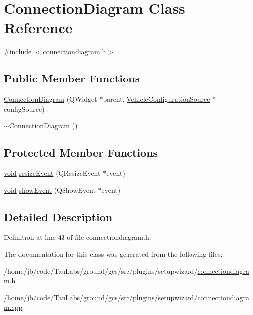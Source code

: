 \hypertarget{class_connection_diagram}{\section{\-Connection\-Diagram \-Class \-Reference}
\label{class_connection_diagram}
}


{\ttfamily \#include $<$connectiondiagram.\-h$>$}

\subsection*{\-Public \-Member \-Functions}
\begin{DoxyCompactItemize}
\item 
\hyperlink{group___connection_diagram_gac4980bbc0b4895238c2f6184739b88b9}{\-Connection\-Diagram} (\-Q\-Widget $\ast$parent, \hyperlink{class_vehicle_configuration_source}{\-Vehicle\-Configuration\-Source} $\ast$config\-Source)
\item 
\hyperlink{group___connection_diagram_gab640bd026ce6a3692e7f4cd1d7d0f907}{$\sim$\-Connection\-Diagram} ()
\end{DoxyCompactItemize}
\subsection*{\-Protected \-Member \-Functions}
\begin{DoxyCompactItemize}
\item 
\hyperlink{group___u_a_v_objects_plugin_ga444cf2ff3f0ecbe028adce838d373f5c}{void} \hyperlink{group___connection_diagram_ga286bacde8e23a0b374d72fb979203bb8}{resize\-Event} (\-Q\-Resize\-Event $\ast$event)
\item 
\hyperlink{group___u_a_v_objects_plugin_ga444cf2ff3f0ecbe028adce838d373f5c}{void} \hyperlink{group___connection_diagram_ga53179afe974da356b81da1fea3ee75b8}{show\-Event} (\-Q\-Show\-Event $\ast$event)
\end{DoxyCompactItemize}


\subsection{\-Detailed \-Description}


\-Definition at line 43 of file connectiondiagram.\-h.



\-The documentation for this class was generated from the following files\-:\begin{DoxyCompactItemize}
\item 
/home/jb/code/\-Tau\-Labs/ground/gcs/src/plugins/setupwizard/\hyperlink{connectiondiagram_8h}{connectiondiagram.\-h}\item 
/home/jb/code/\-Tau\-Labs/ground/gcs/src/plugins/setupwizard/\hyperlink{connectiondiagram_8cpp}{connectiondiagram.\-cpp}\end{DoxyCompactItemize}
